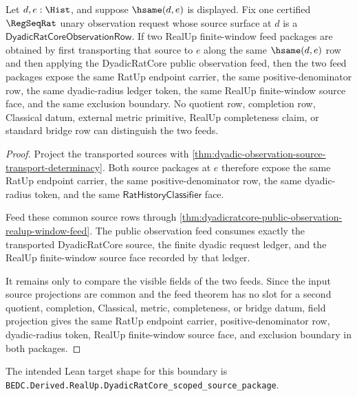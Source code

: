 \begin{theorem}
\label{thm:dyadic-observation-transport-realup-feed-determinacy}
Let $d,e:\Hist$, and suppose $\hsame(d,e)$ is displayed. Fix one certified
$\RegSeqRat$ unary observation request whose source surface at $d$ is a
$\mathsf{DyadicRatCoreObservationRow}$. If two RealUp finite-window feed
packages are obtained by first transporting that source to $e$ along the same
$\hsame(d,e)$ row and then applying the DyadicRatCore public observation feed,
then the two feed packages expose the same RatUp endpoint carrier, the same
positive-denominator row, the same dyadic-radius ledger token, the same RealUp
finite-window source face, and the same exclusion boundary. No quotient row,
completion row, Classical datum, external metric primitive, RealUp completeness
claim, or standard bridge row can distinguish the two feeds.
\end{theorem}
\begin{proof}
Project the transported sources with
\autoref{thm:dyadic-observation-source-transport-determinacy}. Both source
packages at $e$ therefore expose the same RatUp endpoint carrier, the same
positive-denominator row, the same dyadic-radius token, and the same
$\mathsf{RatHistoryClassifier}$ face.

Feed these common source rows through
\autoref{thm:dyadicratcore-public-observation-realup-window-feed}. The public
observation feed consumes exactly the transported DyadicRatCore source, the
finite dyadic request ledger, and the RealUp finite-window source face recorded
by that ledger.

It remains only to compare the visible fields of the two feeds. Since the
input source projections are common and the feed theorem has no slot for a
second quotient, completion, Classical, metric, completeness, or bridge datum,
field projection gives the same RatUp endpoint carrier, positive-denominator
row, dyadic-radius token, RealUp finite-window source face, and exclusion
boundary in both packages.
\end{proof}

The intended Lean target shape for this boundary is
\texttt{BEDC.Derived.RealUp.DyadicRatCore\_scoped\_source\_package}.
